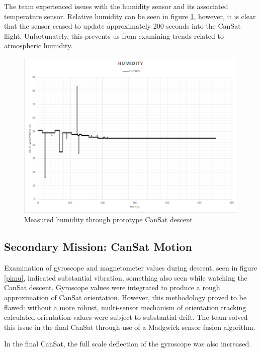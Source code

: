\documentclass[]{report}
\begin{document}
	The team experienced issues with the humidity sensor and its associated temperature sensor. Relative humidity can be seen in figure \ref{hum}, however, it is clear that the sensor ceased to update approximately 200 seconds into the CanSat flight. Unfortunately, this prevents us from examining trends related to atmospheric humidity.

	\begin{figure}[h]
	\hfill\includegraphics[scale=0.7]{humidity.png}\hspace*{\fill}
	\caption{Measured humidity through prototype CanSat descent}
	\label{hum}
	\end{figure}
	
	\subsection{Secondary Mission: CanSat Motion}
	
	Examination of gyroscope and magnetometer values during descent, seen in figure \ref{pimu}, indicated substantial vibration, something also seen while watching the CanSat descent. Gyroscope values were integrated to produce a rough approximation of CanSat orientation. However, this methodology proved to be flawed: without a more robust, multi-sensor mechanism of orientation tracking calculated orientation values were subject to substantial drift. The team solved this issue in the final CanSat through use of a Madgwick sensor fusion algorithm.
	
	In the final CanSat, the full scale deflection of the gyroscope was also increased.
	
\end{document}
